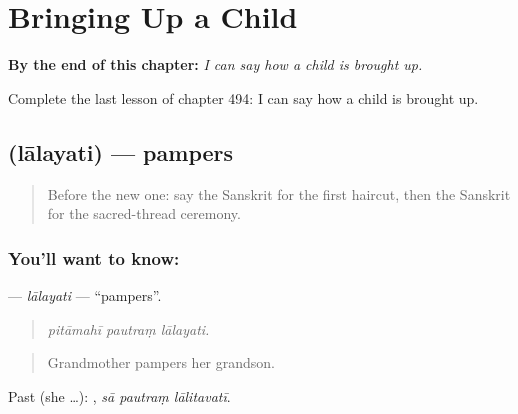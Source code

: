 
\chapter{Bringing Up a Child}
\label{ch:sa-bringing-up-a-child}

\begin{chapteropening}
\textbf{By the end of this chapter:} \emph{I can say how a child is brought up.}

Complete the last lesson of chapter 494: I can say how a child is brought up.
\end{chapteropening}

\section[\texorpdfstring{\sk{लालयति} (lālayati)}{लालयति (lālayati)}]{ (lālayati) — pampers}

\label{lesson:SA-C494-lalayati}



\begin{quote}
Before the new one: say the Sanskrit for the first haircut, then the Sanskrit for the sacred-thread ceremony.
\end{quote}

\subsection*{You'll want to know: }
\textbf{} — \emph{lālayati} — \textquotedblleft{}pampers\textquotedblright{}.

\begin{quote}
  
\end{quote}

\begin{quote}
\emph{pitāmahī pautraṃ lālayati.}
\end{quote}

\begin{quote}
Grandmother pampers her grandson.
\end{quote}

Past (she …):   , \emph{sā pautraṃ lālitavatī}.

